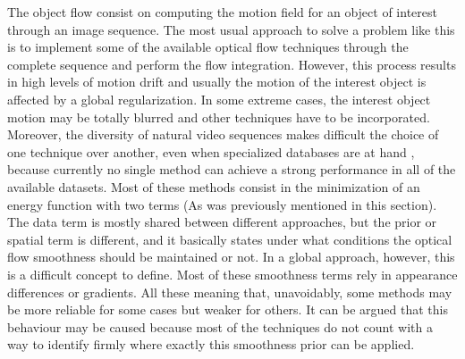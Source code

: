 \label{sec:core}
The object flow consist on computing the motion field for an object of interest through an image
sequence. The most usual approach to solve a problem like this is to implement some of the available
optical flow techniques through the complete sequence and perform the flow integration. 
However, this process results in high levels of motion drift \cite{c18}\cite{c19} and usually the motion of the interest
object is affected by a global regularization. In some extreme cases, the interest object motion
may be totally blurred and other techniques have to be incorporated. Moreover, the diversity
of natural video sequences makes difficult the choice of one technique over another, even when specialized
databases are at hand \cite{c17}, because currently no single method can achieve a strong 
performance in all of the available datasets. Most of these methods consist in the minimization 
of an energy function with two terms (As was previously mentioned in this section). The data
term is mostly shared between different approaches, but the prior or spatial term is different, and it basically states 
under what conditions the optical flow smoothness should be maintained or not. In a global approach, however,
this is a difficult concept to define. Most of these smoothness terms rely in appearance differences or gradients.
All these meaning that, unavoidably, some methods may be more reliable for some cases but weaker for others. 
It can be argued that this behaviour may be caused because most of the techniques do not count with a way to identify 
firmly where exactly this smoothness prior can be applied. 

